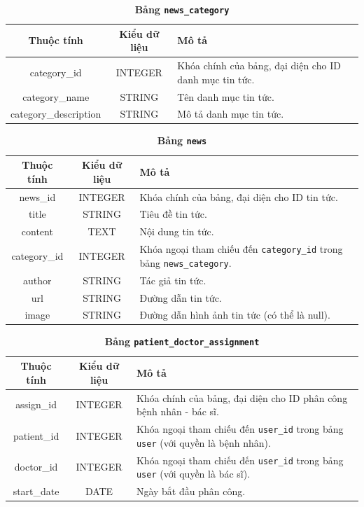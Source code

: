 \begin{table}[H]
  \caption{\bfseries \fontsize{12pt}{0pt}\selectfont Bảng \texttt{news\_category}}
  \centering
  \begin{tabularx}{0.9\textwidth}{|c|c|X|}
    \hline
    \textbf{Thuộc tính} & \textbf{Kiểu dữ liệu} & \textbf{Mô tả} \\
    \hline
    category\_id & INTEGER & Khóa chính của bảng, đại diện cho ID danh mục tin tức. \\
    \hline
    category\_name & STRING & Tên danh mục tin tức. \\
    \hline
    category\_description & STRING & Mô tả danh mục tin tức. \\
    \hline
  \end{tabularx}
\end{table}

\begin{table}[H]
  \caption{\bfseries \fontsize{12pt}{0pt}\selectfont Bảng \texttt{news}}
  \centering
  \begin{tabularx}{0.9\textwidth}{|c|c|X|}
    \hline
    \textbf{Thuộc tính} & \textbf{Kiểu dữ liệu} & \textbf{Mô tả} \\
    \hline
    news\_id & INTEGER & Khóa chính của bảng, đại diện cho ID tin tức. \\
    \hline
    title & STRING & Tiêu đề tin tức. \\
    \hline
    content & TEXT & Nội dung tin tức. \\
    \hline
    category\_id & INTEGER & Khóa ngoại tham chiếu đến \texttt{category\_id} trong bảng \texttt{news\_category}. \\
    \hline
    author & STRING & Tác giả tin tức. \\
    \hline
    url & STRING & Đường dẫn tin tức. \\
    \hline
    image & STRING & Đường dẫn hình ảnh tin tức (có thể là null). \\
    \hline
  \end{tabularx}
\end{table}

\begin{table}[H]
  \caption{\bfseries \fontsize{12pt}{0pt}\selectfont Bảng \texttt{patient\_doctor\_assignment}}
  \centering
  \begin{tabularx}{0.9\textwidth}{|c|c|X|}
    \hline
    \textbf{Thuộc tính} & \textbf{Kiểu dữ liệu} & \textbf{Mô tả} \\
    \hline
    assign\_id & INTEGER & Khóa chính của bảng, đại diện cho ID phân công bệnh nhân - bác sĩ. \\
    \hline
    patient\_id & INTEGER & Khóa ngoại tham chiếu đến \texttt{user\_id} trong bảng \texttt{user} (với quyền là bệnh nhân). \\
    \hline
    doctor\_id & INTEGER & Khóa ngoại tham chiếu đến \texttt{user\_id} trong bảng \texttt{user} (với quyền là bác sĩ). \\
    \hline
    start\_date & DATE & Ngày bắt đầu phân công. \\
    \hline
  \end{tabularx}
\end{table}

